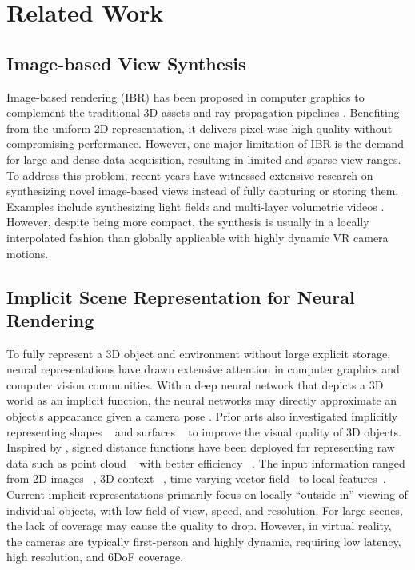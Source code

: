 \section{Related Work}
\label{sec:prior}

\subsection{Image-based View Synthesis}
Image-based rendering (IBR) has been proposed in computer graphics to complement the traditional 3D assets and ray propagation pipelines \cite{levoy1996light,gortler1996lumigraph,shum2000review}. Benefiting from the uniform 2D representation, it delivers pixel-wise high quality without compromising performance. However, one major limitation of IBR is the demand for large and dense data acquisition, resulting in limited and sparse view ranges. 
To address this problem, recent years have witnessed extensive research on synthesizing novel image-based views instead of fully capturing or storing them. Examples include synthesizing light fields \cite{LearningViewSynthesis,Li2020LF,mildenhall2019llff} and multi-layer volumetric videos \cite{Broxton:immersiveLF}. However, despite being more compact, the synthesis is usually in a locally interpolated fashion than globally applicable with highly dynamic VR camera motions.

\subsection{Implicit Scene Representation for Neural Rendering}
To fully represent a 3D object and environment without large explicit storage, neural representations have drawn extensive attention in computer graphics and computer vision communities. 
With a deep neural network that depicts a 3D world as an implicit function, the neural networks may directly approximate an object's appearance given a camera pose \cite{sitzmann2019deepvoxels,sitzmann2019srns,sitzmann2019siren,mildenhall2020nerf,park2017transformation}. 
Prior arts also investigated implicitly representing shapes ~\cite{park2019deepsdf} and surfaces ~\cite{mescheder2019occupancy} to improve the visual quality of 3D objects. Inspired by \cite{park2019deepsdf}, signed distance functions have been deployed for representing raw data such as point cloud ~\cite{atzmon2020sal,gropp2020implicit} with better efficiency ~\cite{chabra2020deep}. 
The input information ranged from 2D images ~\cite{lin2020sdf, yariv2020multiview,choi2019extreme}, 3D context ~\cite{saito2019pifu, oechsle2019texture, zhang2020deep}, time-varying vector field~\cite{niemeyer2019occupancy} to local features~\cite{tretschk2020patchnets, liu2020neural}.
Current implicit representations primarily focus on locally ``outside-in'' viewing of individual objects, with low field-of-view, speed, and resolution. For large scenes, the lack of coverage may cause the quality to drop.
However, in virtual reality, the cameras are typically first-person and highly dynamic, requiring low latency, high resolution, and 6DoF coverage. 

